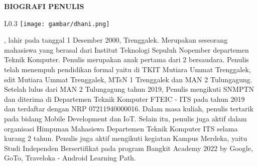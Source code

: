 \begin{center}
  \Large
  \textbf{BIOGRAFI PENULIS}
\end{center}


\vspace{2ex}

\begin{wrapfigure}{L}{0.3\textwidth}
  \centering
  \vspace{-3ex}
  \texttt{[image: gambar/dhani.png]}
  \vspace{-4ex}
\end{wrapfigure}

\name{}, lahir pada \linebreak tanggal 1 Desember 2000, Trenggalek. Merupakan seseorang \linebreak mahasiswa yang berasal dari Institut Teknologi
Sepuluh \linebreak Nopember departemen Teknik Komputer. Penulis merupakan anak pertama dari 2 bersaudara. 
Penulis telah menempuh \linebreak pendidikan formal yaitu di TKIT Mutiara Ummat Trenggalek, sdit Mutiara Ummat Trenggalek, MTsN 1 Trenggalek dan MAN 2 Tulungagung.
Setelah lulus dari MAN 2 Tulungagung tahun 2019, Penulis mengikuti SNMPTN dan diterima di Departemen Teknik Komputer FTEIC - ITS pada tahun 2019 dan terdaftar dengan NRP 07211940000016.
Dalam masa kuliah, penulis tertarik pada bidang Mobile Development dan IoT. Selain itu, penulis juga aktif dalam organisasi Himpunan Mahasiswa \linebreak Departemen Teknik Komputer ITS selama kurang 2 tahun.
Penulis juga aktif mengikuti kegiatan Kampus Merdeka, yaitu Studi Independen Bersertifikat pada program Bangkit Academy 2022 by Google, GoTo, Traveloka - Android Learning Path.
